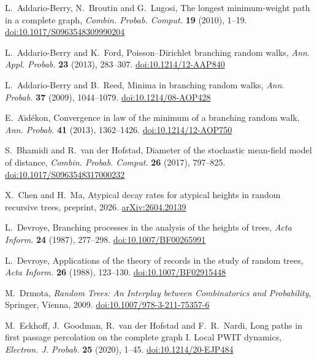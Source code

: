  L.~Addario-Berry, N.~Broutin and G.~Lugosi, The longest minimum-weight path in a complete graph,
\emph{Combin. Probab. Comput.} \textbf{19} (2010), 1--19. \href{https://doi.org/10.1017/S0963548309990204}{doi:10.1017/S0963548309990204}

 L.~Addario-Berry and K.~Ford, Poisson--Dirichlet branching random walks,
\emph{Ann. Appl. Probab.} \textbf{23} (2013), 283--307. \href{https://doi.org/10.1214/12-AAP840}{doi:10.1214/12-AAP840}

 L.~Addario-Berry and B.~Reed, Minima in branching random walks,
\emph{Ann. Probab.} \textbf{37} (2009), 1044--1079. \href{https://doi.org/10.1214/08-AOP428}{doi:10.1214/08-AOP428}

 E.~A\"{\i}d\'ekon, Convergence in law of the minimum of a branching random walk,
\emph{Ann. Probab.} \textbf{41} (2013), 1362--1426. \href{https://doi.org/10.1214/12-AOP750}{doi:10.1214/12-AOP750}

 S.~Bhamidi and R.~van der Hofstad, Diameter of the stochastic mean-field model of distance,
\emph{Combin. Probab. Comput.} \textbf{26} (2017), 797--825. \href{https://doi.org/10.1017/S0963548317000232}{doi:10.1017/S0963548317000232}

 X.~Chen and H.~Ma, Atypical decay rates for atypical heights in random recursive trees,
preprint, 2026. \href{https://arxiv.org/abs/2604.20139}{arXiv:2604.20139}

 L.~Devroye, Branching processes in the analysis of the heights of trees,
\emph{Acta Inform.} \textbf{24} (1987), 277--298. \href{https://doi.org/10.1007/BF00265991}{doi:10.1007/BF00265991}

 L.~Devroye, Applications of the theory of records in the study of random trees,
\emph{Acta Inform.} \textbf{26} (1988), 123--130. \href{https://doi.org/10.1007/BF02915448}{doi:10.1007/BF02915448}

 M.~Drmota, \emph{Random Trees: An Interplay between Combinatorics and Probability}, Springer, Vienna, 2009.
\href{https://doi.org/10.1007/978-3-211-75357-6}{doi:10.1007/978-3-211-75357-6}

 M.~Eckhoff, J.~Goodman, R.~van der Hofstad and F.~R.~Nardi, Long paths in first passage percolation on
the complete graph I. Local PWIT dynamics, \emph{Electron. J. Probab.} \textbf{25} (2020), 1--45.
\href{https://doi.org/10.1214/20-EJP484}{doi:10.1214/20-EJP484}

